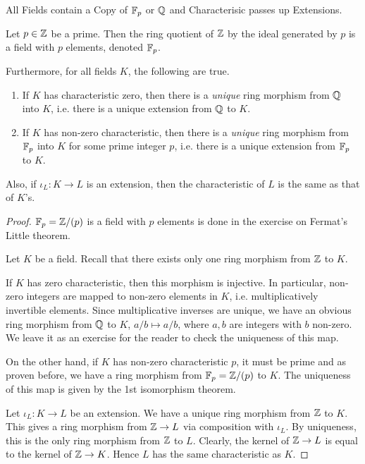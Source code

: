 \documentclass[../book.tex]{subfiles}
\begin{document}
\begin{thm} All Fields contain a Copy of $\mathbb{F}_p$ or $\mathbb{Q}$ and 
Characterisic passes up Extensions.
    
    Let $p \in \mathbb{Z}$ be a prime. 
    Then the ring quotient of $\mathbb{Z}$ by the ideal generated by $p$ 
    is a field with $p$ elements, denoted $\mathbb{F}_p$.
    
    Furthermore, for all fields $K$, the following are true. 
    \begin{enumerate}
        \item If $K$ has characteristic zero, 
        then there is a \emph{unique} ring morphism from $\mathbb{Q}$ into $K$,
        i.e. there is a unique extension from $\mathbb{Q}$ to $K$.
        \item If $K$ has non-zero characteristic,
        then there is a \emph{unique} ring morphism from $\mathbb{F}_p$ into $K$
        for some prime integer $p$,
        i.e. there is a unique extension from $\mathbb{F}_p$ to $K$.
    \end{enumerate}
    Also, if $\iota_L : K \to L$ is an extension,
    then the characteristic of $L$ is the same as that of $K$'s.
    
\end{thm}
\begin{proof}
    
    $\mathbb{F}_p = \mathbb{Z} / (p) $ is a field with $p$ elements is done 
    in the exercise on Fermat's Little theorem.
    
    Let $K$ be a field. 
    Recall that there exists only one ring morphism from $\mathbb{Z}$ to $K$. 
    
    If $K$ has zero characteristic, then this morphism is injective.
    In particular, non-zero integers are mapped to non-zero elements in $K$,
    i.e. multiplicatively invertible elements. 
    Since multiplicative inverses are unique, 
    we have an obvious ring morphism from $\mathbb{Q}$ to $K$, 
    $a / b \mapsto a / b$, where $a, b$ are integers with $b$ non-zero. 
    We leave it as an exercise for the reader to check the uniqueness of this map.
    
    On the other hand, if $K$ has non-zero characteristic $p$, it must be prime
    and as proven before, we have a ring morphism from $\mathbb{F}_p = \mathbb{Z} / (p)$ to $K$.
    The uniqueness of this map is given by the 1st isomorphism theorem.
    
    Let $\iota_L : K \to L$ be an extension.
    We have a unique ring morphism from $\mathbb{Z}$ to $K$.
    This gives a ring morphism from $\mathbb{Z} \to L$ via composition with $\iota_L$.
    By uniqueness, this is the only ring morphism from $\mathbb{Z}$ to $L$.
    Clearly, the kernel of $\mathbb{Z} \to L$ is equal to the kernel of $\mathbb{Z} \to K$.
    Hence $L$ has the same characteristic as $K$.
    
\end{proof}
\end{document}
